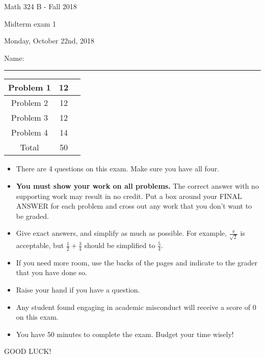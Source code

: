 \documentclass[12 pt]{report}
\begin{document}
\noindent \vfill \noindent \large

\centerline{Math 324 B - Fall 2018}

\centerline{Midterm exam 1}

\centerline{Monday, October 22nd, 2018}

\normalsize

\vfill
\medskip
Name: \rule{10cm}{1pt}

\bigskip

\vfill
\begin{center}
{\large
\begin{tabular}{||c|c|r||}
\hline Problem 1 & 12 & \hspace{10mm} \hfill \\
\hline Problem 2 & 12  & \hspace{10mm} \hfill \\
\hline Problem 3 & 12 & \hspace{10mm} \hfill \\
\hline Problem 4 & 14  & \hspace{10mm} \hfill \\
\hline Total & 50 & \hspace{10mm} \hfill \\
\hline
\end{tabular}
}
\end{center}
\vfill
\begin{itemize}
\item There are 4 questions on this exam. Make sure you have all four.
\item \textbf{You must show your work on all problems.}  The correct answer
with no supporting work may result in no credit. Put a box
around your FINAL ANSWER for each problem and cross out any work
that you don't want to be graded.
\item Give exact answers, and simplify as much as possible. 
For example, $\frac{\pi}{\sqrt{2}}$ is acceptable, but $\frac{1}{2} + \frac{3}{4}$
should be simplified to $\frac{5}{4}$.  

\item If you need more room, use the backs
of the pages and indicate to the grader that you have done so.
\item Raise your hand if you have a question.
\item Any student found engaging in academic misconduct will receive
a score of 0 on this exam.
\item You have 50 minutes to complete the exam.  Budget your time wisely! \\
\end{itemize}
\vfill
\begin{center}GOOD LUCK!\end{center}
\end{document}
